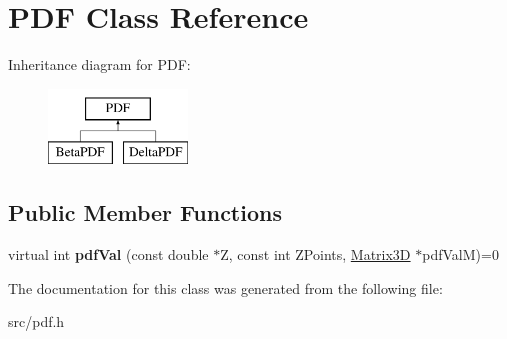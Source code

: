 \hypertarget{classPDF}{
\section{PDF Class Reference}
\label{dc/d2d/classPDF}
}
Inheritance diagram for PDF:\begin{figure}[H]
\begin{center}
\leavevmode
\includegraphics[height=2cm]{dc/d2d/classPDF}
\end{center}
\end{figure}
\subsection*{Public Member Functions}
\begin{DoxyCompactItemize}
\item 
\hypertarget{classPDF_aa1c76d504f181d271734bba54068c51b}{
virtual int {\bfseries pdfVal} (const double $\ast$Z, const int ZPoints, \hyperlink{classMatrix3D}{Matrix3D} $\ast$pdfValM)=0}
\label{dc/d2d/classPDF_aa1c76d504f181d271734bba54068c51b}

\end{DoxyCompactItemize}


The documentation for this class was generated from the following file:\begin{DoxyCompactItemize}
\item 
src/pdf.h\end{DoxyCompactItemize}
